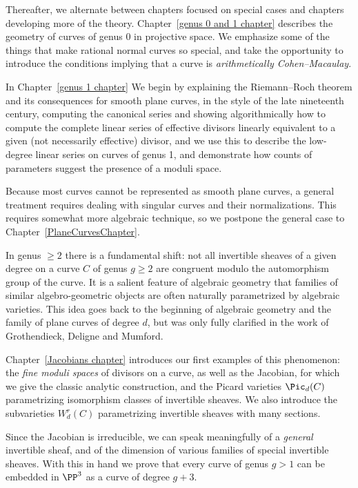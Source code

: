 Thereafter, we alternate between chapters focused on special cases and
chapters developing more of the theory. Chapter~\ref{genus 0 and 1 chapter}  
describes the geometry of curves of genus 0  in projective
space. We emphasize some of the things that make rational normal
curves so special, and take the opportunity to introduce the
conditions implying that a curve is \emph{arithmetically Cohen--Macaulay}.

In Chapter~\ref{genus 1 chapter} We begin by explaining the
Riemann--Roch theorem and its consequences for smooth plane curves,  in
the style of the late 
nineteenth
century, computing the canonical series and showing algorithmically how to compute the complete linear series of effective divisors linearly equivalent to a given (not necessarily effective) divisor, and we use this 
to describe the low-degree linear series on curves of genus 1, and demonstrate how counts of parameters suggest the presence of a moduli space.

Because most curves cannot be represented as smooth plane curves, a general treatment requires dealing with
singular curves and their normalizations. This requires somewhat more algebraic technique, so we postpone the general case to Chapter~\ref{PlaneCurvesChapter}.  

In genus $\geq 2$ there is a fundamental shift: not all invertible sheaves of a given degree on a curve $C$ of genus $g \geq 2$ are congruent modulo the automorphism group of the curve.
It is a salient feature of algebraic geometry that families of similar algebro-geometric objects are often naturally parametrized by algebraic varieties. This idea goes back to the beginning of algebraic geometry and the family of plane curves of degree $d$, but was only fully clarified in the work of Grothendieck, Deligne and Mumford.
%
%

Chapter~\ref{Jacobians chapter} introduces our first examples of this phenomenon: the \emph{fine moduli spaces} of divisors on a curve, as well as the Jacobian, for which we give the classic analytic construction, and the Picard varieties $\Pic_d(C)$ parametrizing isomorphism classes of invertible sheaves. We also introduce the subvarieties $W^{r}_{d}(C)$ parametrizing invertible sheaves with many sections. 

 Since the Jacobian is irreducible, we can speak meaningfully of a \emph{general} invertible sheaf, and of the dimension of various families of special invertible sheaves. With this in hand we prove
that every curve of genus $g>1$ can be embedded in $\PP^{3}$ as a curve of degree $g+3$.

